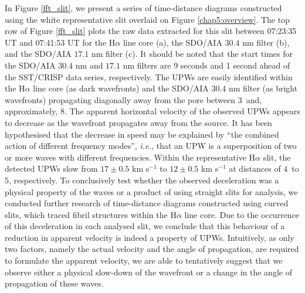	In Figure \ref{fft_slit}, we present a series of time-distance diagrams constructed using the white representative slit overlaid on Figure \ref{chap5:overview}.
	The top row of Figure \ref{fft_slit} plots the raw data extracted for this slit between 07:23:35 UT and 07:41:53 UT for the H$\alpha$ line core (a), the SDO/AIA $30.4$ nm filter (b), and the SDO/AIA $17.1$ nm filter (c).
	It should be noted that the start times for the SDO/AIA $30.4$ nm and $17.1$ nm filters are 9 seconds and 1 second ahead of the SST/CRISP data series, respectively.
	The UPWs are easily identified within the H$\alpha$ line core (as dark wavefronts) and the SDO/AIA $30.4$ nm filter (as bright wavefronts) propagating diagonally away from the pore between $3$\arcsecs\ and, approximately, $8$\arcsecs.
	The apparent horizontal velocity of the observed UPWs appears to decrease as the wavefront propagates away from the source.
	It has been hypothesised that the decrease in speed may be explained by ``the combined action of different frequency modes''\citep{UTMO}, \textit{i.e.,} that an UPW is a superposition of two or more waves with different frequencies.
	Within the representative H$\alpha$ slit, the detected UPWs slow from $17\pm0.5$ km s$^{-1}$ to $12\pm0.5$ km s$^{-1}$ at distances of $4$\arcsecs\ to $5$\arcsecs, respectively.
	To conclusively test whether the observed deceleration was a physical property of the waves or a product of using straight slits for analysis, we conducted further research of time-distance diagrams constructed using curved slits, which traced fibril 	structures within the H$\alpha$ line core.
	Due to the occurrence of this deceleration in each analysed slit, we conclude that this behaviour of a reduction in apparent velocity is indeed a property of UPWs.
	Intuitively, as only two factors, namely the actual velocity and the angle of propagation, are required to formulate the apparent velocity, we are able to tentatively suggest that we observe either a physical slow-down of the wavefront or a change in the angle of propagation of these waves.

